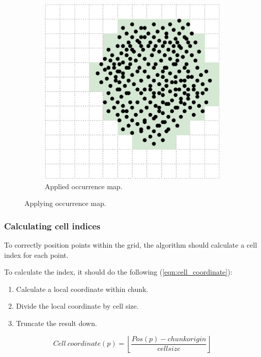 \begin{figure}[ht]
    \begin{subfigure}[t]{0.4\textwidth}
        \includegraphics[width=\textwidth]{occurrence-map-applied.pdf}
        \caption{Applied occurrence map.}
    \end{subfigure}
    
    \caption{Applying occurrence map.}
    \label{fig:occurrence_map}
\end{figure}


\subsubsection{Calculating cell indices}

To correctly position points within the grid, the algorithm should calculate a cell index for each point.

To calculate the index, it should do the following (\ref{eqn:cell_coordinate}):
\begin{enumerate}
    \item Calculate a local coordinate within chunk.
    \item Divide the local coordinate by cell size.
    \item Truncate the result down.
\end{enumerate}

\begin{equation}
\label{eqn:cell_coordinate}
Cell\:coordinate(p) = \left \lfloor \frac{Pos(p) - chunk origin}{cell size} \right \rfloor
\end{equation}


